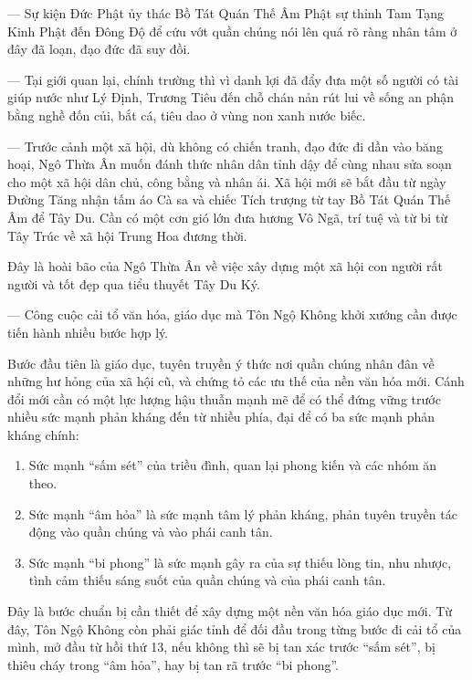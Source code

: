--- Sự kiện Đức Phật ủy thác Bồ Tát Quán Thế Âm Phật sự thỉnh Tam Tạng Kinh Phật đến Đông Độ để cứu vớt quần chúng nói lên quá rõ ràng nhân tâm ở đây đã loạn, đạo đức đã suy đồi.

--- Tại giới quan lại, chính trường thì vì danh lợi đã đẩy đưa một số người có tài giúp nước như Lý Định, Trương Tiêu đến chỗ chán nản rút lui về sống an phận bằng nghề đốn củi, bắt cá, tiêu dao ở vùng non xanh nước biếc.

--- Trước cảnh một xã hội, dù không có chiến tranh, đạo đức đi dần vào băng hoại, Ngô Thừa Ân muốn đánh thức nhân dân tỉnh dậy để cùng nhau sửa soạn cho một xã hội dân chủ, công bằng và nhân ái. Xã hội mới sẽ bắt đầu từ ngày Đường Tăng nhận tấm áo Cà sa và chiếc Tích trượng từ tay Bồ Tát Quán Thế Âm để Tây Du. Cần có một cơn gió lớn đưa hương Vô Ngã, trí tuệ và từ bi từ Tây Trúc về xã hội Trung Hoa đương thời.

Đây là hoài bão của Ngô Thừa Ân về việc xây dựng một xã hội con người rất người và tốt đẹp qua tiểu thuyết Tây Du Ký.

--- Công cuộc cải tổ văn hóa, giáo dục mà Tôn Ngộ Không khởi xướng cần được tiến hành nhiều bước hợp lý.

Bước đầu tiên là giáo dục, tuyên truyền ý thức nơi quần chúng nhân đân về những hư hỏng của xã hội cũ, và chứng tỏ các ưu thế của nền văn hóa mới. Cánh đổi mới cần có một lực lượng hậu thuẫn mạnh mẽ để có thể đứng vững trước nhiều sức mạnh phản kháng đến từ nhiều phía, đại để có ba sức mạnh phản kháng chính:

\begin{enumerate}[label=\itshape\arabic*\upshape/]
    \item Sức mạnh ``sấm sét'' của triều đình, quan lại phong kiến và các nhóm ăn theo.

    \item Sức mạnh ``âm hỏa'' là sức mạnh tâm lý phản kháng, phản tuyên truyền tác động vào quần chúng và vào phái canh tân.

    \item Sức mạnh ``bi phong'' là sức mạnh gây ra của sự thiếu lòng tin, nhu nhược, tình cảm thiếu sáng suốt của quần chúng và của phái canh tân.
\end{enumerate}

Đây là bước chuẩn bị cần thiết để xây dựng một nền văn hóa giáo dục mới. Từ đây, Tôn Ngộ Không còn phải giác tỉnh để đối đầu trong từng bước đi cải tổ của mình, mở đầu từ hồi thứ 13, nếu không thì sẽ bị tan xác trước ``sấm sét'', bị thiêu cháy trong ``âm hỏa'', hay bị tan rã trước ``bi phong''.

